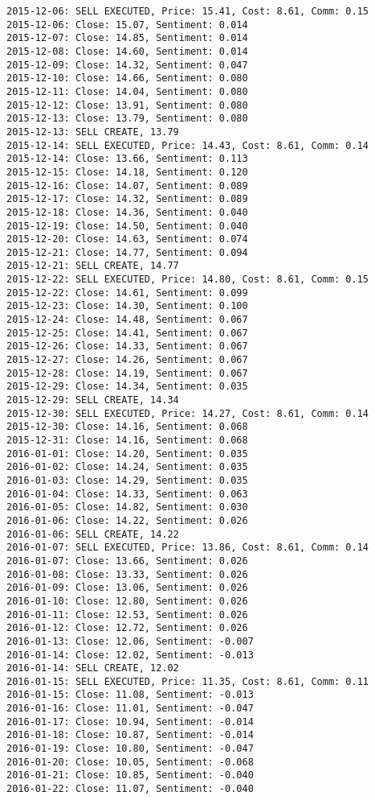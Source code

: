 \documentclass[11pt]{article}
\begin{document}
\begin{Verbatim}[commandchars=\\\{\}]
2015-12-06: SELL EXECUTED, Price: 15.41, Cost: 8.61, Comm: 0.15
2015-12-06: Close: 15.07, Sentiment: 0.014
2015-12-07: Close: 14.85, Sentiment: 0.014
2015-12-08: Close: 14.60, Sentiment: 0.014
2015-12-09: Close: 14.32, Sentiment: 0.047
2015-12-10: Close: 14.66, Sentiment: 0.080
2015-12-11: Close: 14.04, Sentiment: 0.080
2015-12-12: Close: 13.91, Sentiment: 0.080
2015-12-13: Close: 13.79, Sentiment: 0.080
2015-12-13: SELL CREATE, 13.79
2015-12-14: SELL EXECUTED, Price: 14.43, Cost: 8.61, Comm: 0.14
2015-12-14: Close: 13.66, Sentiment: 0.113
2015-12-15: Close: 14.18, Sentiment: 0.120
2015-12-16: Close: 14.07, Sentiment: 0.089
2015-12-17: Close: 14.32, Sentiment: 0.089
2015-12-18: Close: 14.36, Sentiment: 0.040
2015-12-19: Close: 14.50, Sentiment: 0.040
2015-12-20: Close: 14.63, Sentiment: 0.074
2015-12-21: Close: 14.77, Sentiment: 0.094
2015-12-21: SELL CREATE, 14.77
2015-12-22: SELL EXECUTED, Price: 14.80, Cost: 8.61, Comm: 0.15
2015-12-22: Close: 14.61, Sentiment: 0.099
2015-12-23: Close: 14.30, Sentiment: 0.100
2015-12-24: Close: 14.48, Sentiment: 0.067
2015-12-25: Close: 14.41, Sentiment: 0.067
2015-12-26: Close: 14.33, Sentiment: 0.067
2015-12-27: Close: 14.26, Sentiment: 0.067
2015-12-28: Close: 14.19, Sentiment: 0.067
2015-12-29: Close: 14.34, Sentiment: 0.035
2015-12-29: SELL CREATE, 14.34
2015-12-30: SELL EXECUTED, Price: 14.27, Cost: 8.61, Comm: 0.14
2015-12-30: Close: 14.16, Sentiment: 0.068
2015-12-31: Close: 14.16, Sentiment: 0.068
2016-01-01: Close: 14.20, Sentiment: 0.035
2016-01-02: Close: 14.24, Sentiment: 0.035
2016-01-03: Close: 14.29, Sentiment: 0.035
2016-01-04: Close: 14.33, Sentiment: 0.063
2016-01-05: Close: 14.82, Sentiment: 0.030
2016-01-06: Close: 14.22, Sentiment: 0.026
2016-01-06: SELL CREATE, 14.22
2016-01-07: SELL EXECUTED, Price: 13.86, Cost: 8.61, Comm: 0.14
2016-01-07: Close: 13.66, Sentiment: 0.026
2016-01-08: Close: 13.33, Sentiment: 0.026
2016-01-09: Close: 13.06, Sentiment: 0.026
2016-01-10: Close: 12.80, Sentiment: 0.026
2016-01-11: Close: 12.53, Sentiment: 0.026
2016-01-12: Close: 12.72, Sentiment: 0.026
2016-01-13: Close: 12.06, Sentiment: -0.007
2016-01-14: Close: 12.02, Sentiment: -0.013
2016-01-14: SELL CREATE, 12.02
2016-01-15: SELL EXECUTED, Price: 11.35, Cost: 8.61, Comm: 0.11
2016-01-15: Close: 11.08, Sentiment: -0.013
2016-01-16: Close: 11.01, Sentiment: -0.047
2016-01-17: Close: 10.94, Sentiment: -0.014
2016-01-18: Close: 10.87, Sentiment: -0.014
2016-01-19: Close: 10.80, Sentiment: -0.047
2016-01-20: Close: 10.05, Sentiment: -0.068
2016-01-21: Close: 10.85, Sentiment: -0.040
2016-01-22: Close: 11.07, Sentiment: -0.040

\end{Verbatim}
\end{document}
